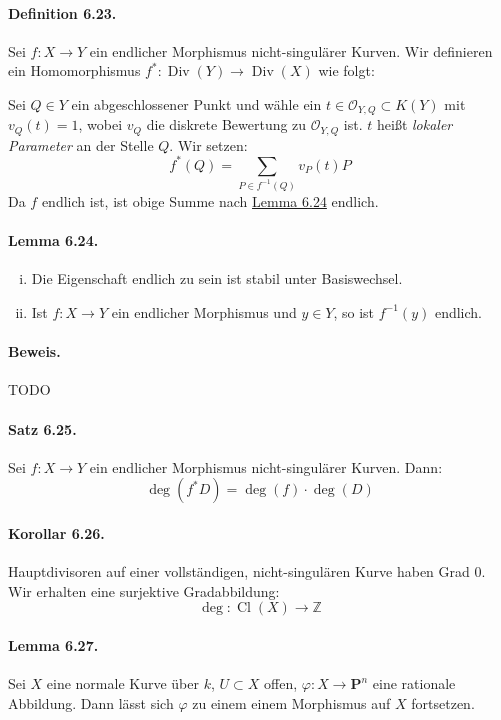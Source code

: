 \documentclass[11pt,b5paper,openany]{memoir}
\begin{document}
\paragraph{Definition 6.23.}\label{6.23} Sei $f:X\to Y$ ein endlicher Morphismus nicht-singulärer Kurven. Wir definieren ein Homomorphismus $f^\ast:\operatorname{Div}(Y)\to\operatorname{Div}(X)$ wie folgt:

Sei $Q\in Y$ ein abgeschlossener Punkt und wähle ein $t\in\mathcal{O}_{Y,Q}\subset K(Y)$ mit $v_Q(t)=1$, wobei $v_Q$ die diskrete Bewertung zu $\mathcal{O}_{Y,Q}$ ist. $t$ heißt \textit{lokaler Parameter} an der Stelle $Q$. Wir setzen:
\[f^\ast(Q) = \sum_{P\in f^{-1}(Q)}v_P(t)P \]
Da $f$ endlich ist, ist obige Summe nach \hyperref[6.24]{Lemma 6.24} endlich.

\paragraph{Lemma 6.24.}\label{6.24} \begin{enumerate}[(i)]
\item Die Eigenschaft endlich zu sein ist stabil unter Basiswechsel.
\item Ist $f:X\to Y$ ein endlicher Morphismus und $y\in Y$, so ist $f^{-1}(y)$ endlich.
\end{enumerate}

\paragraph{Beweis.} TODO

\paragraph{Satz 6.25.}\label{6.25} Sei $f:X\to Y$ ein endlicher Morphismus nicht-singulärer Kurven. Dann:
\[\deg(f^\ast D)=\deg(f)\cdot \deg(D) \]

\paragraph{Korollar 6.26.}\label{6.26} Hauptdivisoren auf einer vollständigen, nicht-singulären Kurve haben Grad $0$. Wir erhalten eine surjektive Gradabbildung:
\[\deg:\operatorname{Cl}(X)\to\mathbb{Z} \]

\paragraph{Lemma 6.27.}\label{6.27} Sei $X$ eine normale Kurve über $k$, $U\subset X$ offen, $\varphi:X\to\mathbf{P}^n$ eine rationale Abbildung. Dann lässt sich $\varphi$ zu einem einem Morphismus auf $X$ fortsetzen.
\end{document}
